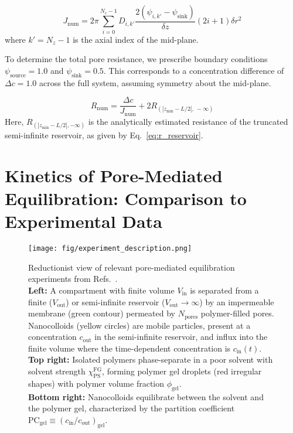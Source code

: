 \documentclass[10pt, a4paper, twocolumn]{article}
\begin{document}
\begin{equation}
    J_{\text{num}} = 2\pi \sum_{i=0}^{N_r-1} D_{i,k'} \frac{2(\psi_{i,k'} - \psi_{\text{sink}})}{\delta z} (2i + 1) \delta r^2
\end{equation}
where $k' = N_z - 1$ is the axial index of the mid-plane.

To determine the total pore resistance, we prescribe boundary conditions $\psi_{\text{source}} = 1.0$ and $\psi_{\text{sink}} = 0.5$.
This corresponds to a concentration difference of $\Delta c = 1.0$ across the full system, assuming symmetry about the mid-plane.

\begin{equation}
    R_{\text{num}} = \frac{\Delta c}{J_{\text{num}}} + 2 R_{\left(\left|z_{\text{min}} - L/2\right|,\ -\infty\right)}
\end{equation}
Here, $R_{(|z_{\text{min}} - L/2|, -\infty)}$ is the analytically estimated resistance of the truncated semi-infinite reservoir, as given by Eq.~\ref{eq:r_reservoir}.



\section{Kinetics of Pore-Mediated Equilibration: Comparison to Experimental Data}



\begin{figure}[]
    \centering
    \texttt{[image: fig/experiment\_description.png]}
    \caption{Reductionist view of relevant pore-mediated equilibration experiments from Refs.~\cite{Ribbeck2001, Mohr2009, Popken2015, Timney2016, Frey2018}.\\
    \textbf{Left:} A compartment with finite volume $V_{\text{in}}$ is separated from a finite ($V_\text{out}$) or semi-infinite reservoir ($V_\text{out}\to \infty$)  by an impermeable membrane (green contour) permeated by $N_{\text{pores}}$ polymer-filled pores. 
    Nanocolloids (yellow circles) are mobile particles, present at a concentration $c_{\text{out}}$ in the semi-infinite reservoir, and influx into the finite volume where the time-dependent concentration is $c_{\text{in}}(t)$.\\
    \textbf{Top right:} Isolated polymers phase-separate in a poor solvent with solvent strength $\chi_{\text{PS}}^{\text{FG}}$, forming polymer gel droplets (red irregular shapes) with polymer volume fraction $\phi_{\text{gel}}$.\\
    \textbf{Bottom right:} Nanocolloids equilibrate between the solvent and the polymer gel, characterized by the partition coefficient $\text{PC}_{\text{gel}} \equiv \left(c_{\text{in}}/c_{\text{out}}\right)_{\text{gel}}$.
    }
    \label{fig:experiments_overview}
\end{figure}
    
\end{document}
